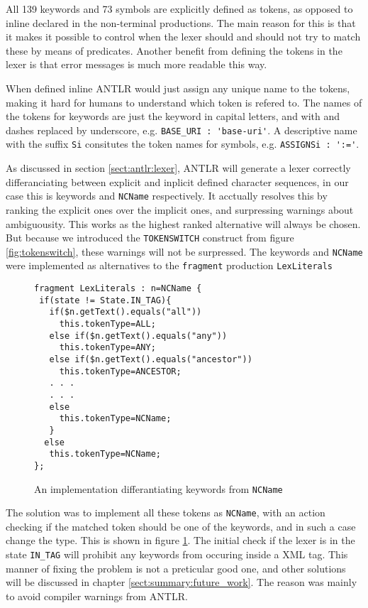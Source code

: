 All 139 keywords and 73 symbols are explicitly defined as tokens, as opposed to inline declared in the non-terminal productions. The main reason for this is that it makes it possible to control when the lexer should and should not try to match these by means of predicates. Another benefit from defining the tokens in the lexer is that error messages is much more readable this way. 

When defined inline ANTLR would just assign any unique name to the tokens, making it hard for humans to understand which token is refered to. The names of the tokens for keywords are just the keyword in capital letters, and with and dashes replaced by underscore, e.g. \verb!BASE_URI : 'base-uri'!. A descriptive name with the suffix \verb!Si! consitutes the token names for symbols, e.g. \verb!ASSIGNSi : ':='!.

As discussed in section \ref{sect:antlr:lexer}, ANTLR will generate a lexer correctly differanciating between explicit and inplicit defined character sequences, in our case this is keywords and \verb!NCName! respectively. It acctually resolves this by ranking the explicit ones over the implicit ones, and surpressing warnings about ambiguousity. This works as the highest ranked alternative will always be chosen. But because we introduced the \verb!TOKENSWITCH! construct from figure \ref{fig:tokenswitch}, these warnings will not be surpressed. The keywords and \verb!NCName! were implemented as alternatives to the \verb!fragment! production \verb!LexLiterals! 

\begin{figure}[h!]
\begin{verbatim}
fragment LexLiterals : n=NCName {
 if(state != State.IN_TAG){
   if($n.getText().equals("all")) 
     this.tokenType=ALL;
   else if($n.getText().equals("any")) 
     this.tokenType=ANY;
   else if($n.getText().equals("ancestor")) 
     this.tokenType=ANCESTOR;
   . . .
   . . .
   else 
     this.tokenType=NCName;
   }
  else
   this.tokenType=NCName;
};
\end{verbatim}
\caption[Differantiating keywords from \texttt{NCName}]{An implementation differantiating keywords from \texttt{NCName}}
\label{fig:lexLitterals}
\end{figure}

The solution was to implement all these tokens as \verb!NCName!, with an action checking if the matched token should be one of the keywords, and in such a case change the type. This is shown in figure \ref{fig:lexLitterals}. The initial check if the lexer is in the state \verb!IN_TAG! will prohibit any keywords from occuring inside a XML tag. This manner of fixing the problem is not a preticular good one, and other solutions will be discussed in chapter \ref{sect:summary:future_work}. The reason was mainly to avoid compiler warnings from ANTLR.

